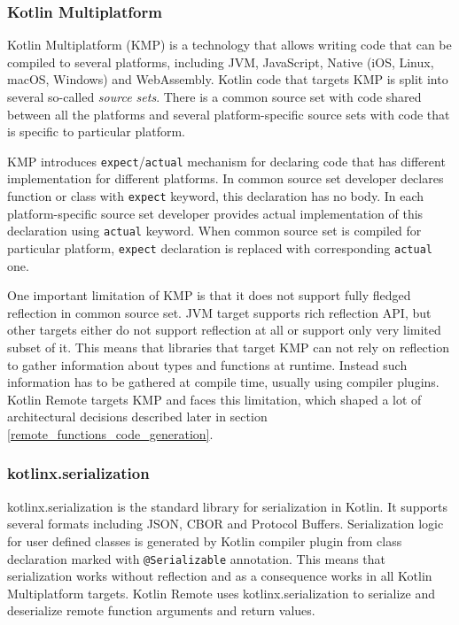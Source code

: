 \documentclass[a4paper,11pt,oneside]{article}
\newcommand{\term}[1]{\textit{#1}}
\newcommand{\kotlini}[1]{\texttt{#1}}
\begin{document}
\subsubsection{Kotlin Multiplatform} \label{kotlin-multiplatform-section}

Kotlin Multiplatform (KMP) \cite{noauthor_kotlin_multiplatform_nodate} is a technology that allows
writing code that can be compiled to several platforms, including JVM, JavaScript, Native (iOS,
Linux, macOS, Windows) and WebAssembly. Kotlin code that targets KMP is split into several
so-called \term{source sets}. There is a common source set with code shared between all the
platforms and several platform-specific source sets with code that is specific to particular
platform.

KMP introduces \kotlini{expect}/\kotlini{actual} mechanism for declaring code that has different
implementation for different platforms. In common source set developer declares function or class
with \kotlini{expect} keyword, this declaration has no body. In each platform-specific source set
developer provides actual implementation of this declaration using \kotlini{actual} keyword. When
common source set is compiled for particular platform, \kotlini{expect} declaration is replaced
with corresponding \kotlini{actual} one.

One important limitation of KMP is that it does not support fully fledged reflection in common
source set. JVM target supports rich reflection API, but other targets either do not support
reflection at all or support only very limited subset of it. This means that libraries that target
KMP can not rely on reflection to gather information about types and functions at runtime. Instead
such information has to be gathered at compile time, usually using compiler plugins. Kotlin Remote
targets KMP and faces this limitation, which shaped a lot of architectural decisions described
later in section \ref{remote_functions_code_generation}.

\subsubsection{kotlinx.serialization}

kotlinx.serialization \cite{noauthor_kotlinkotlinxserialization_2026} is the standard library for
serialization in Kotlin. It supports several formats including JSON, CBOR and Protocol Buffers.
Serialization logic for user defined classes is generated by Kotlin compiler plugin from class
declaration marked with \kotlini{@Serializable} annotation. This means that serialization works
without reflection and as a consequence works in all Kotlin Multiplatform targets. Kotlin Remote
uses kotlinx.serialization to serialize and deserialize remote function arguments and return
values.
\end{document}
